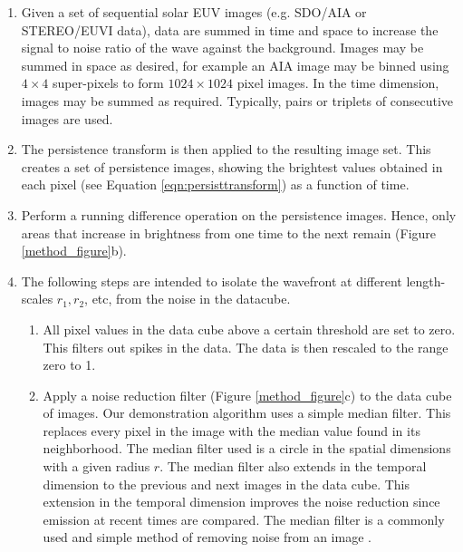 \documentclass[namedreferences]{solarphysics}
\begin{document}
\begin{article}
\begin{enumerate}

\item Given a set of sequential solar EUV images (e.g. SDO/AIA or
  STEREO/EUVI data), data are summed in time and space to increase the
  signal to noise ratio of the wave against the background. Images may
  be summed in space as desired, for example an AIA image may be
  binned using $4\times4$ super-pixels to form $1024\times1024$ pixel
  images. In the time dimension, images may be summed as
  required. Typically, pairs or triplets of consecutive images are
  used.

\item The persistence transform is then applied to the resulting image
  set.  This creates a set of persistence images, showing the
  brightest values obtained in each pixel (see Equation
  \ref{eqn:persisttransform}) as a function of time.

\item Perform a running difference operation on the
  persistence images. Hence, only areas that increase in brightness
  from one time to the next remain (Figure \ref{method_figure}b).

\item 
The following steps are intended to isolate the wavefront at different
length-scales $r_{1}, r_{2}$\textellipsis, etc, from the noise in the
datacube.

\begin{enumerate}

\item All pixel values in the data cube above a certain threshold are
  set to zero. This filters out spikes in the data.  The data is then
  rescaled to the range zero to 1.

\item Apply a noise reduction filter (Figure \ref{method_figure}c) to
  the data cube of images.  Our demonstration algorithm uses a simple
  median filter.  This replaces every pixel in the image with the
  median value found in its neighborhood.  The median filter used is a
  circle in the spatial dimensions with a given radius $r$.  The
  median filter also extends in the temporal dimension to the previous
  and next images in the data cube.  This extension in the temporal
  dimension improves the noise reduction since emission at recent
  times are compared.  The median filter is a commonly used and simple
  method of removing noise from an image \citep{2002dip..book.....G}.


\end{enumerate}
\end{enumerate}
\end{article}
\end{document}
